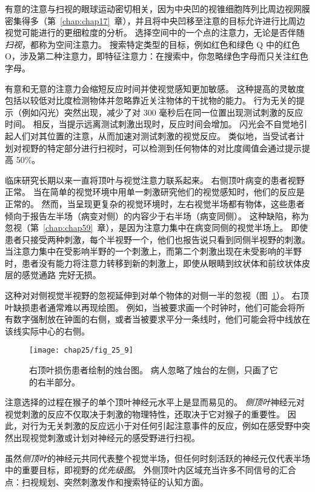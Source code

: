 有意的注意与扫视的眼球运动密切相关，因为中央凹的视锥细胞阵列比周边视网膜密集得多（第~\ref{chap:chap17}~章），并且将中央凹移至注意的目标允许进行比周边视觉可能进行的更细粒度的分析。
选择空间中的一个点的注意力，无论是否伴随\textit{扫视}，都称为空间注意力。
搜索特定类型的目标，例如红色和绿色 Q 中的红色 O，涉及第二种注意力，即特征注意力：在搜索中，你忽略绿色字母而只关注红色字母。


有意和无意的注意力会缩短反应时间并使视觉感知更加敏感。
这种提高的灵敏度包括以较低对比度检测物体并忽略靠近关注物体的干扰物的能力。
行为无关的提示（例如闪光）突然出现，减少了对 300 毫秒后在同一位置出现测试刺激的反应时间。
相反，当提示远离测试刺激出现时，反应时间会增加。
闪光会不自觉地引起人们对其位置的注意，从而加速对测试刺激的视觉反应。
类似地，当受试者计划对视野的特定部分进行扫视时，可以检测到任何物体的对比度阈值会通过提示提高 50\%。


临床研究长期以来一直将顶叶与视觉注意力联系起来。
右侧顶叶病变的患者视野正常。
当在简单的视觉环境中用单一刺激研究他们的视觉感知时，他们的反应是正常的。
然而，当呈现更复杂的视觉环境时，左右视觉半场都有物体，这些患者倾向于报告左半场（病变对侧）的内容少于右半场（病变同侧）。
这种缺陷，称为忽视（第~\ref{chap:chap59}~章），是因为注意力集中在病变同侧的视觉半场上。
即使患者只接受两种刺激，每个半视野一个，他们也报告说只看到同侧半视野的刺激。
当注意力集中在受影响半野的一个刺激上，而第二个刺激出现在未受影响的半野时，患者没有能力将注意力转移到新的刺激上，即使从眼睛到纹状体和前纹状体皮层的感觉通路 完好无损。


这种对对侧视觉半视野的忽视延伸到对单个物体的对侧一半的忽视（图~\ref{fig:25_9}）。
右顶叶缺损患者通常难以再现绘图。
例如，当被要求画一个时钟时，他们可能会将所有数字强制放在钟面的右侧，或者当被要求平分一条线时，他们可能会将中线放在该线实际中心的右侧。


\begin{figure}[htbp]
	\centering
	\texttt{[image: chap25/fig\_25\_9]}
	\caption{右顶叶损伤患者绘制的烛台图。
		病人忽略了烛台的左侧，只画了它的右半部分。}
	\label{fig:25_9}
\end{figure}


注意选择的过程在猴子的单个顶叶神经元水平上是显而易见的。
\textit{侧顶叶}神经元对视觉刺激的反应不仅取决于刺激的物理特性，还取决于它对猴子的重要性。
因此，对行为无关刺激的反应远小于对任何引起注意事件的反应，例如在感受野中突然出现视觉刺激或计划对神经元的感受野进行扫视。


虽然\textit{侧顶叶}的神经元共同代表整个视觉半场，但任何时刻活跃的神经元仅代表半场中的重要目标，即视野的\textit{优先级图}。
外侧顶叶内区域充当许多不同信号的汇合点：扫视规划、突然刺激发作和搜索特征的认知方面。


